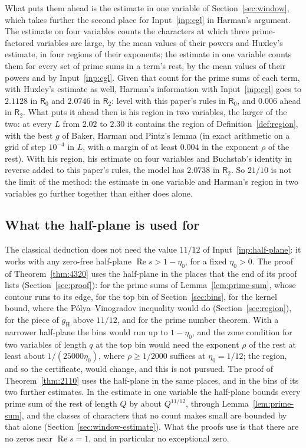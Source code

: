 \documentclass[11pt]{article}
\theoremstyle{definition}
\begin{document}
What puts them ahead is the estimate in one variable of Section~\ref{sec:window}, which takes further the second
place for Input~\ref{inp:cgl} in Harman's argument. The estimate on four variables counts the characters at which
three prime-factored variables are large, by the mean values of their powers and Huxley's estimate, in four regions
of their exponents; the estimate in one variable counts them for every set of prime sums in a term's rest, by the
mean values of their powers and by Input~\ref{inp:cgl}. Given that count for the prime sums of each term, with
Huxley's estimate as well, Harman's information with Input~\ref{inp:cgl} goes to $2.1128$ in $\mathsf R_0$ and
$2.0746$ in $\mathsf R_2$: level with this paper's rules in $\mathsf R_0$, and $0.006$ ahead in $\mathsf R_2$. What
puts it ahead then is his region in two variables, the larger of the two: at every $L$ from $2.02$ to $2.30$ it
contains the region of Definition~\ref{def:region}, with the best $g$ of Baker, Harman and Pintz's lemma \cite{bhp}
(in exact arithmetic on a grid of step $10^{-4}$ in $L$, with a margin of at least $0.004$ in the exponent $\rho$ of
the rest). With his region, his estimate on four variables and Buchstab's identity in reverse added to this paper's
rules, the model has $2.0738$ in $\mathsf R_2$. So $21/10$ is not the limit of the method: the estimate in one
variable and Harman's region in two variables go further together than either does alone.

\subsection*{What the half-plane is used for}

The classical deduction does not need the value $11/12$ of Input~\ref{inp:half-plane}: it works with any zero-free
half-plane $\operatorname{Re} s > 1 - \eta_0$, for a fixed $\eta_0 > 0$. The proof of Theorem~\ref{thm:4320} uses the
half-plane in the places that the end of its proof lists (Section~\ref{sec:proof}): for the prime sums of
Lemma~\ref{lem:prime-sum}, whose contour runs to its edge, for the top bin of Section~\ref{sec:bins}, for the kernel
bound, where the Pólya--Vinogradov inequality would do (Section~\ref{sec:region}), for the piece of $g_{\mathrm H}$
above $11/12$, and for the prime number theorem. With a narrower half-plane the bins would run up to $1 -
\eta_0$, and the zone condition for two variables of length $q$ at the top bin would need the exponent $\rho$ of the
rest at least about
$1/(25000\eta_0)$, where $\rho \ge 1/2000$ suffices at $\eta_0 = 1/12$; the region, and so the certificate, would
change, and this is not pursued. The proof of
Theorem~\ref{thm:2110} uses the half-plane in the same places, and in the bins of its two further estimates. In the
estimate in one variable the half-plane bounds every prime sum of the rest of length $Q$ by about $Q^{11/12}$, through
Lemma~\ref{lem:prime-sum}, and the classes of characters that no count makes small are bounded by that alone
(Section~\ref{sec:window-estimate}). What the proofs use is that there are no zeros near $\operatorname{Re} s = 1$, and
in particular no exceptional zero.
\end{document}
